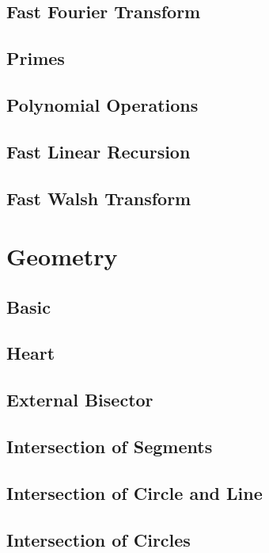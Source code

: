\subsection{Fast Fourier Transform}

\subsection{Primes}

\subsection{Polynomial Operations}

\subsection{Fast Linear Recursion}

\subsection{Fast Walsh Transform}


\section{Geometry}
\subsection{Basic}

\subsection{Heart}

\subsection{External Bisector}

\subsection{Intersection of Segments}

\subsection{Intersection of Circle and Line}

\subsection{Intersection of Circles}

